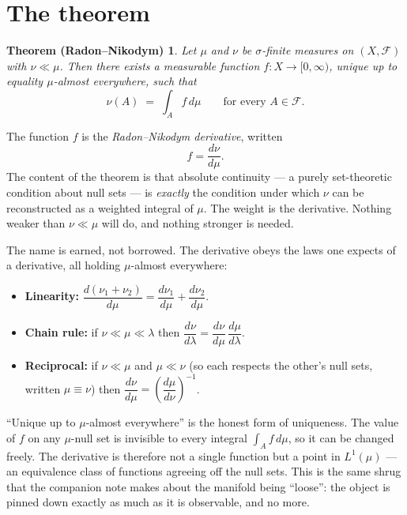 \documentclass[11pt]{article}
\newtheorem*{theorem}{Theorem (Radon--Nikodym)}
\begin{document}
\section{The theorem}

\begin{theorem}
Let $\mu$ and $\nu$ be $\sigma$-finite measures on $(X, \mathcal{F})$ with $\nu \ll \mu$.
Then there exists a measurable function $f : X \to [0, \infty)$, unique up to equality
$\mu$-almost everywhere, such that
\[
  \nu(A) \;=\; \int_A f \, d\mu \qquad \text{for every } A \in \mathcal{F}.
\]
\end{theorem}

The function $f$ is the \emph{Radon--Nikodym derivative}, written
\[
  f = \frac{d\nu}{d\mu}.
\]
The content of the theorem is that absolute continuity --- a purely set-theoretic condition
about null sets --- is \emph{exactly} the condition under which $\nu$ can be reconstructed as
a weighted integral of $\mu$. The weight is the derivative. Nothing weaker than $\nu \ll \mu$
will do, and nothing stronger is needed.

The name is earned, not borrowed. The derivative obeys the laws one expects of a derivative,
all holding $\mu$-almost everywhere:
\begin{itemize}[leftmargin=1.4em]
  \item \textbf{Linearity:} $\dfrac{d(\nu_1 + \nu_2)}{d\mu} = \dfrac{d\nu_1}{d\mu} +
  \dfrac{d\nu_2}{d\mu}$.
  \item \textbf{Chain rule:} if $\nu \ll \mu \ll \lambda$ then
  $\dfrac{d\nu}{d\lambda} = \dfrac{d\nu}{d\mu}\,\dfrac{d\mu}{d\lambda}$.
  \item \textbf{Reciprocal:} if $\nu \ll \mu$ and $\mu \ll \nu$ (so each respects the other's
  null sets, written $\mu \equiv \nu$) then $\dfrac{d\nu}{d\mu} = \left(\dfrac{d\mu}{d\nu}
  \right)^{-1}$.
\end{itemize}

\begin{insight}
``Unique up to $\mu$-almost everywhere'' is the honest form of uniqueness. The value of $f$
on any $\mu$-null set is invisible to every integral $\int_A f\,d\mu$, so it can be changed
freely. The derivative is therefore not a single function but a point in $L^1(\mu)$ --- an
equivalence class of functions agreeing off the null sets. This is the same shrug that the
companion note makes about the manifold being ``loose'': the object is pinned down exactly as
much as it is observable, and no more.
\end{insight}
\end{document}

